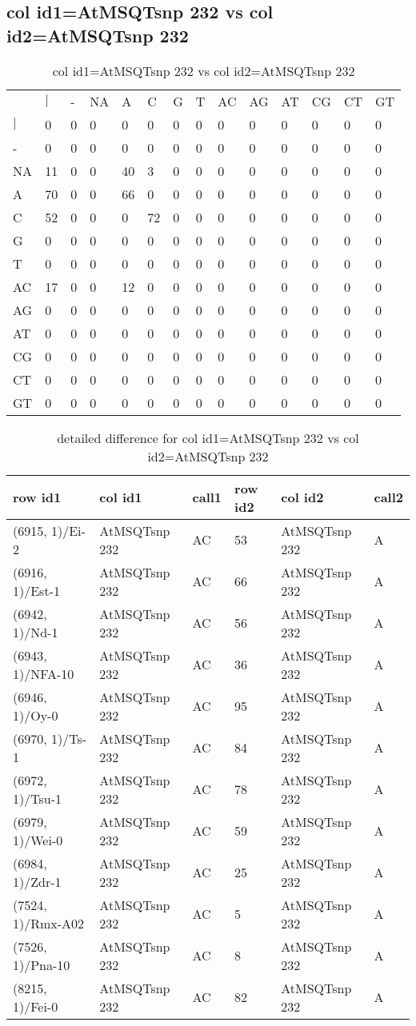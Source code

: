 \subsection{col id1=AtMSQTsnp 232 vs col id2=AtMSQTsnp 232}
\begin{center}
\begin{longtable}{|l|l|l|l|l|l|l|l|l|l|l|l|l|l|}
\caption{col id1=AtMSQTsnp 232 vs col id2=AtMSQTsnp 232} \label{table_dm792}\\
\hline
\\
\hline
&$|$&-&NA&A&C&G&T&AC&AG&AT&CG&CT&GT\\
$|$&0&0&0&0&0&0&0&0&0&0&0&0&0\\
-&0&0&0&0&0&0&0&0&0&0&0&0&0\\
NA&11&0&0&40&3&0&0&0&0&0&0&0&0\\
A&70&0&0&66&0&0&0&0&0&0&0&0&0\\
C&52&0&0&0&72&0&0&0&0&0&0&0&0\\
G&0&0&0&0&0&0&0&0&0&0&0&0&0\\
T&0&0&0&0&0&0&0&0&0&0&0&0&0\\
AC&17&0&0&12&0&0&0&0&0&0&0&0&0\\
AG&0&0&0&0&0&0&0&0&0&0&0&0&0\\
AT&0&0&0&0&0&0&0&0&0&0&0&0&0\\
CG&0&0&0&0&0&0&0&0&0&0&0&0&0\\
CT&0&0&0&0&0&0&0&0&0&0&0&0&0\\
GT&0&0&0&0&0&0&0&0&0&0&0&0&0\\
\hline
\end{longtable}
\end{center}

\begin{center}
\begin{longtable}{|l|l|l|l|l|l|}
\caption{detailed difference for col id1=AtMSQTsnp 232 vs col id2=AtMSQTsnp 232} \label{table_dm793}\\
\hline
row id1&col id1&call1&row id2&col id2&call2\\
\hline
(6915, 1)/Ei-2&AtMSQTsnp 232&AC&53&AtMSQTsnp 232&A\\
(6916, 1)/Est-1&AtMSQTsnp 232&AC&66&AtMSQTsnp 232&A\\
(6942, 1)/Nd-1&AtMSQTsnp 232&AC&56&AtMSQTsnp 232&A\\
(6943, 1)/NFA-10&AtMSQTsnp 232&AC&36&AtMSQTsnp 232&A\\
(6946, 1)/Oy-0&AtMSQTsnp 232&AC&95&AtMSQTsnp 232&A\\
(6970, 1)/Ts-1&AtMSQTsnp 232&AC&84&AtMSQTsnp 232&A\\
(6972, 1)/Tsu-1&AtMSQTsnp 232&AC&78&AtMSQTsnp 232&A\\
(6979, 1)/Wei-0&AtMSQTsnp 232&AC&59&AtMSQTsnp 232&A\\
(6984, 1)/Zdr-1&AtMSQTsnp 232&AC&25&AtMSQTsnp 232&A\\
(7524, 1)/Rmx-A02&AtMSQTsnp 232&AC&5&AtMSQTsnp 232&A\\
(7526, 1)/Pna-10&AtMSQTsnp 232&AC&8&AtMSQTsnp 232&A\\
(8215, 1)/Fei-0&AtMSQTsnp 232&AC&82&AtMSQTsnp 232&A\\
\hline
\end{longtable}
\end{center}

